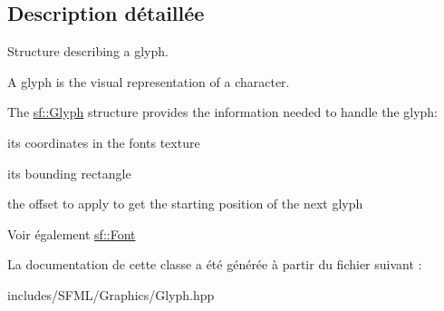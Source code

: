 \subsection{Description détaillée}
Structure describing a glyph. 

A glyph is the visual representation of a character.

The \hyperlink{classsf_1_1Glyph}{sf\+::\+Glyph} structure provides the information needed to handle the glyph\+: \begin{DoxyItemize}
\item its coordinates in the font\textquotesingle{}s texture \item its bounding rectangle \item the offset to apply to get the starting position of the next glyph\end{DoxyItemize}
\begin{DoxySeeAlso}{Voir également}
\hyperlink{classsf_1_1Font}{sf\+::\+Font} 
\end{DoxySeeAlso}


La documentation de cette classe a été générée à partir du fichier suivant \+:\begin{DoxyCompactItemize}
\item 
includes/\+S\+F\+M\+L/\+Graphics/Glyph.\+hpp\end{DoxyCompactItemize}
